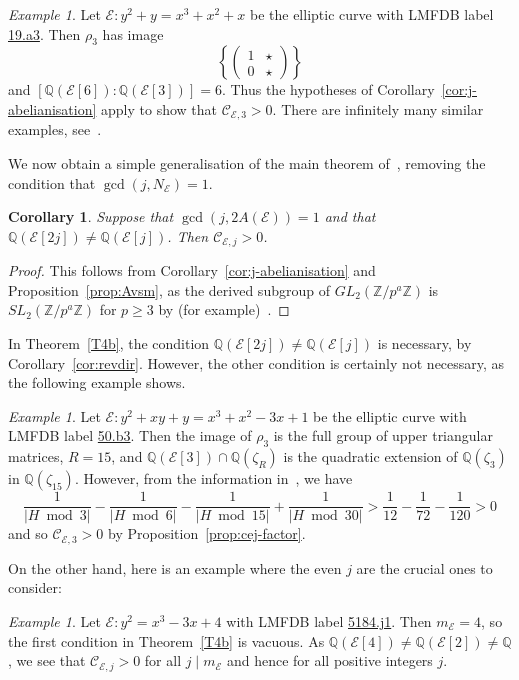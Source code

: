 \documentclass{amsart}
\theoremstyle{plain}
\newtheorem{cor}[theorem]{Corollary}
\theoremstyle{remark}
\newtheorem{example}[theorem]{Example}
\newcommand{\Q}{\mathbb{Q}}
\newcommand{\Z}{\mathbb{Z}}
\newcommand{\E}{\mathcal{E}}
\newcommand{\Cc}{\mathcal{C}}
\begin{document}
\begin{example} Let $\E : y^2+y=x^3+x^2+x$ be the elliptic curve with LMFDB label \href{https://www.lmfdb.org/EllipticCurve/Q/19/a/3}{19.a3}. Then $\rho_3$ has image 
\[\left\{\begin{pmatrix}1 & \star  \\ 0  & \star \end{pmatrix}\right\}\]
and $[\Q(\E[6]) : \Q(\E[3])] = 6$. Thus the hypotheses of Corollary~\ref{cor:j-abelianisation} apply to show that $\Cc_{\E, 3} > 0$. There are infinitely many similar examples, see~\cite{zywina_possible_2015}.
\end{example}
We now obtain a simple generalisation of the main theorem of~\cite{Kim}, removing the condition that $\gcd(j, N_\E) = 1$.
\begin{cor} \label{cor:j-coprime-6AE} Suppose that $\gcd(j, 2A(\E)) = 1$ and that $\Q(\E[2j]) \ne \Q(\E[j])$. Then $\Cc_{\E,j} > 0$.
\end{cor}
\begin{proof}
    This follows from Corollary~\ref{cor:j-abelianisation} and Proposition~\ref{prop:Avsm}, as the derived subgroup of $GL_2(\Z/p^a\Z)$ is $SL_2(\Z/p^a\Z)$ for $p \ge 3$ by (for example)~\cite[Lemma~7.7]{zywinaExplicitOpenImages2024}.
\end{proof}

In Theorem~\ref{T4b}, the condition $\Q(\E[2j]) \ne \Q(\E[j])$ is necessary, by Corollary~\ref{cor:revdir}. However, the other condition is certainly not necessary, as the following example shows.
\begin{example}
    Let $\E : y^2+xy+y=x^3+x^2-3x+1$ be the elliptic curve with LMFDB label \href{https://www.lmfdb.org/EllipticCurve/Q/50/b/3}{50.b3}. Then the image of $\rho_3$ is the full group of upper triangular matrices, $R = 15$, and $\Q(\E[3]) \cap \Q(\zeta_R)$ is the quadratic extension of $\Q(\zeta_3)$ in $\Q(\zeta_{15})$. However, from the information in~\cite{lmfdb}, we have 
    \[\frac{1}{|H\bmod 3|} - \frac{1}{|H\bmod 6|} - \frac{1}{|H\bmod 15|} + \frac{1}{|H\bmod 30|} > \frac{1}{12} - \frac{1}{72} - \frac{1}{120} > 0\]
    and so $\Cc_{\E,3} > 0$ by Proposition~\ref{prop:cej-factor}.
\end{example}
On the other hand, here is an example where the even $j$ are the crucial ones to consider:
\begin{example} Let $\E: y^2=x^3-3x+4$ with LMFDB label \href{https://www.lmfdb.org/EllipticCurve/Q/5184/j/1}{5184.j1}. Then $m_\E = 4$, so the first condition in Theorem~\ref{T4b} is vacuous. As $\Q(\E[4]) \neq \Q(\E[2]) \neq \Q$, we see that $\Cc_{\E,j}>0$ for all $j \mid m_\E$ and hence for all positive integers $j$.
\end{example}
\end{document}
